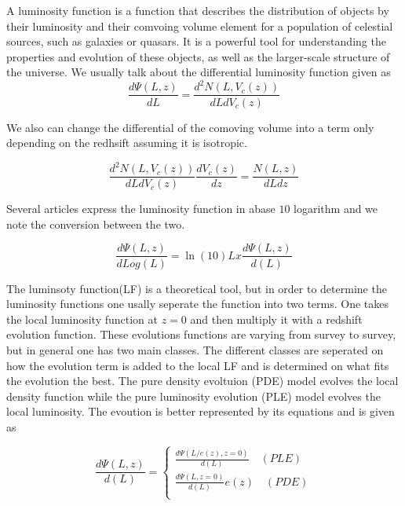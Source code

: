 \documentclass{article}
\begin{document}
A luminosity function is a function that describes the distribution of objects by their luminosity and their comvoing volume element for a population of celestial sources,
such as galaxies or quasars. It is a powerful tool for understanding the properties and evolution of 
these objects, as well as the larger-scale structure of the universe. 
 We usually talk about the differential luminosity function given as
\begin{equation}
    \frac{d\Psi(L,z)}{dL} = \frac{d^2N(L,V_c(z))}{dLdV_c(z)}
\end{equation}

We also can change the differential of the comoving volume into a term only depending on the redhsift assuming it is isotropic.

\begin{equation}
    \frac{d^2N(L,V_c(z))}{dLdV_c(z)}\frac{dV_c(z)}{dz} = \frac{N(L,z)}{dLdz}
\end{equation}


Several articles express the luminosity function in abase $10$ logarithm and we note the conversion between the two. 

\begin{equation}
    \frac{d\Psi(L,z)}{dLog(L)} =  \ln (10)  Lx \frac{d\Psi(L,z)}{d(L)}
\end{equation}


The luminsoty function(LF) is a theoretical tool, but in order to determine the luminosity functions one usally seperate the function into two terms. 
One takes the local luminosity function at $z=0$ and then multiply it with a redshift evolution function. These evolutions functions
are varying from survey to survey, but in general one has two main classes. 
The different classes are seperated on how the evolution term is added to the local LF and is determined on what fits the evolution the best. 
The pure density evoltuion (PDE) model evolves the local density function while the pure luminosity evolution (PLE) model evolves the local luminosity.
The evoution is better represented by its equations and is given as 

\begin{equation}\frac{d\Psi(L,z)}{d(L)} = 
    \begin{cases}
        \frac{d\Psi(L/e(z),z=0)}{d(L)} \quad (PLE)\\
        \frac{d\Psi(L,z=0)}{d(L)}e(z) \quad (PDE)\\
    \end{cases}
\end{equation}
\end{document}
